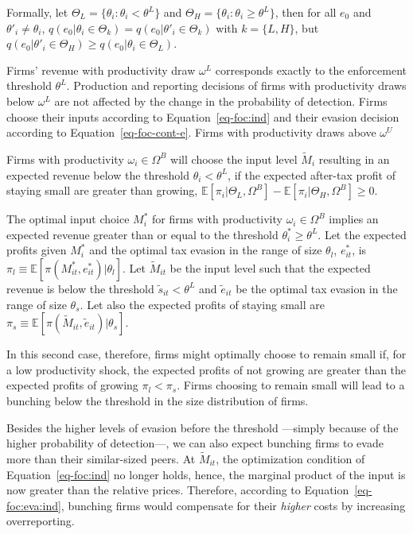 \documentclass[
  12pt]{article}
\theoremstyle{definition}
\theoremstyle{remark}
\begin{document}
Formally, let \(\Theta_{L} = \{\theta_i : \theta_{i} < \theta^L \}\) and
\(\Theta_{H} = \{\theta_i : \theta_{i} \ge \theta^L \}\), then for all
\(e_0\) and \(\theta'_i\not=\theta_i\),
\(q(e_0|\theta_i \in \Theta_k)=q(e_0|\theta'_i \in \Theta_k)\) with
\(k=\{L,H\}\), but
\(q(e_0|\theta'_i \in \Theta_H)\ge q(e_0|\theta_i \in \Theta_L)\).

Firms' revenue with productivity draw \(\omega^L\) corresponds exactly
to the enforcement threshold \(\theta^L\). Production and reporting
decisions of firms with productivity draws below \(\omega^L\) are not
affected by the change in the probability of detection. Firms choose
their inputs according to Equation~\ref{eq-foc:ind} and their evasion
decision according to Equation~\ref{eq-foc-cont-e}. Firms with
productivity draws above \(\omega^U\)

Firms with productivity \(\omega_{i}\in \Omega^B\) will choose the input
level \(\tilde{M}_{i}\) resulting in an expected revenue below the
threshold \(\theta_{i}<\theta^L\), if the expected after-tax profit of
staying small are greater than growing,
\(\mathbb{E}[\pi_{i}|\Theta_L, \Omega^B]-\mathbb{E}[\pi_{i}|\Theta_H, \Omega^B]\ge0\).

The optimal input choice \(M^*_{i}\) for firms with productivity
\(\omega_i\in\Omega^B\) implies an expected revenue greater than or
equal to the threshold \(\theta^*_{i}\ge \theta^L\). Let the expected
profits given \(M^*_{i}\) and the optimal tax evasion in the range of
size \(\theta_l\), \(e^*_{it}\), is
\(\pi_l\equiv\mathbb{E}[\pi(M^*_{it}, e^*_{it})|\theta_l]\). Let
\(\tilde{M}_{it}\) be the input level such that the expected revenue is
below the threshold \(\tilde{s}_{it}<\theta^L\) and \(\tilde{e}_{it}\)
be the optimal tax evasion in the range of size \(\theta_s\). Let also
the expected profits of staying small are
\(\pi_s\equiv\mathbb{E}[\pi(\tilde{M}_{it},\tilde{e}_{it})|\theta_s]\).

In this second case, therefore, firms might optimally choose to remain
small if, for a low productivity shock, the expected profits of not
growing are greater than the expected profits of growing
\(\pi_l<\pi_s\). Firms choosing to remain small will lead to a bunching
below the threshold in the size distribution of firms.

Besides the higher levels of evasion before the threshold ---simply
because of the higher probability of detection---, we can also expect
bunching firms to evade more than their similar-sized peers. At
\(\tilde{M}_{it}\), the optimization condition of
Equation~\ref{eq-foc:ind} no longer holds, hence, the marginal product
of the input is now greater than the relative prices. Therefore,
according to Equation~\ref{eq-foc:eva:ind}, bunching firms would
compensate for their \emph{higher} costs by increasing overreporting.
\end{document}
